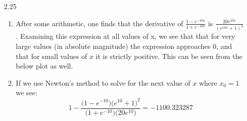 \documentclass[11pt,a4paper]{article}
\begin{document}
\begin{itemize}
\begin{enumerate} [label={\alph*)}]
					Now we can see that in order to get rid of the absolute value symbol, when $f'>0$ then the numerator is positive and we can get rid of it, no problem. If $f'<0$ then the absolute value would indicate we need to subtract subtract the negative so we still have a positive value in the numerator. Depending on what sign $f'$ takes we will want to select the sign that allows us to cancel out both terms.
					\item We know from the Newton Method that $x_{i+1} = x_i - \frac{f(x_i)}{f'(x_i)}$. By rearranging the terms we can solve for the equation given in the problem as follows:
					\begin{align*}
						x_{i+1} &= x_i - \frac{f(x_i)}{f'(x_i)} \\
						x_{i+1} - x_i &=  - \frac{f(x_i)}{f'(x_i)} \\
						(x_{i+1} - x_i)(x_{i+1} - x_i) &=  - (x_{i+1} - x_i) \frac{f(x_i)}{f'(x_i)} \\
						(x_{i+1} - x_i)^2 &=  - (x_{i+1} - x_i) \frac{f(x_i)}{f'(x_i)}
					\end{align*}
					Substituting this into our second-order Taylor approximation gives the following:
					\begin{align*}
						0 &= f(x_i) + f'(x_i)(x_{i+1}-x_i) - \frac{1}{2}f''(x_i)(x_{i+1} - x_i) \frac{f(x_i)}{f'(x_i)} \\
						0 &= f(x_i) + (x_{i+1}-x_i)\Big[f'(x_i) - \frac{1}{2}f''(x_i)\frac{f(x_i)}{f'(x_i)}\Big] \\
						x_{i+1} &= x_i - \frac{f(x_i)}{f'(x_i) - \frac{1}{2}f''(x_i)\frac{f(x_i)}{f'(x_i)}}*\frac{2f'(x_i)}{2f'(x_i)}\\
						x_{i+1} &= x_i - \frac{2f(x_i)f'(x_i)}{2f'(x_i)^2 - f''(x_i)f(x_i)}
					\end{align*}
				\end{enumerate}
			\item[2.25]
				\begin{enumerate} [label={\alph*)}]
					\item After some arithmetic, one finds that the derivative of $\frac{1-e^{-10x}}{1+e^{-10x}}$ is $\frac{20e^{10x}}{(e^{10x}+1)^2}$. Examining this expression at all values of x, we see that that for very large values (in absolute magnitude) the expression approaches 0, and that for small values of $x$ it is strictly positive. This can be seen from the below plot as well.
					
					\item If we use Newton's method to solve for the next value of $x$ where $x_0=1$ we see:
					$$1 - \frac{\big(1-e^{-10}\big)\big(e^{10}+1\big)^2}{\big(1+e^{-10}\big)\big(20e^{10}\big)} = -1100.323287$$
					
				\end{enumerate}
					
			 	
		\end{itemize}
		
\end{document}
